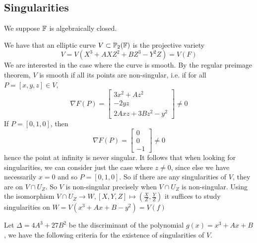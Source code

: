 \subsection{Singularities}

We suppose $\mathbb{F}$ is algebraically closed.
	
We have that an elliptic curve $V \subset \mathbb{P}_2(\mathbb{F})$
is the projective variety
\begin{equation}
	V = V(X^3 + AXZ^2 + BZ^3 - Y^2Z) = V(F)
\end{equation}
We are interested in the case where the curve is smooth.
By the regular preimage theorem, $V$ is smooth if all its points
are non-singular, i.e. if for all $P = [x, y, z] \in V$,
\begin{equation*}
	\nabla F(P) = 
	\begin{bmatrix}
		3x^2 + Az^2\\
		-2yz\\
		2Axz + 3Bz^2 - y^2
	\end{bmatrix}
	\neq 0
\end{equation*}
If $P = [0, 1, 0]$, then 
\begin{equation*}
	\nabla F(P) = 
	\begin{bmatrix}
		0\\
		0\\
		-1
	\end{bmatrix} \neq 0
\end{equation*}
hence the point at infinity is never singular. It follows
that when looking for singularities, we can consider just
the case where $z \neq 0$, since else we have necessarily $x = 0$
and so $P = [0, 1, 0]$. So if there are any singularities of $V$,
they are on $V \cap U_Z$. So $V$ is non-singular precisely when
$V \cap U_Z$ is non-singular. Using the isomorphism
$V \cap U_Z \to W, [X, Y, Z] \mapsto (\frac{X}{Z}, \frac{Y}{Z})$ it
suffices to study singularities on $W = V(x^3 + Ax + B - y^2)
= V(f)$

Let $\Delta = 4A^3 + 27B^2$ be the discriminant of the polynomial
$g(x) = x^3 + Ax + B$, we have the following criteria for the
existence of singularities of $V$.

